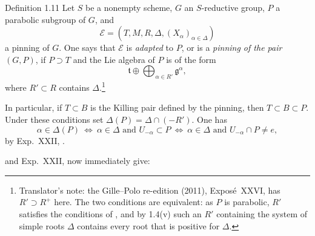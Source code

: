 \begin{sgastatement}{Definition 1.11}
Let \(S\) be a nonempty scheme, \(G\) an \(S\)-reductive group, \(P\) a
parabolic subgroup of \(G\), and
\[
 \mathcal E=(T,M,R,\Delta,(X_\alpha)_{\alpha\in\Delta})
\]
a pinning of \(G\).  One says that \(\mathcal E\) is \emph{adapted} to
\(P\), or is a \emph{pinning of the pair \((G,P)\)}, if \(P\supset T\) and
the Lie algebra of \(P\) is of the form
\[
 \mathfrak t\oplus\bigoplus_{\alpha\in R'}\mathfrak g^\alpha,
\]
where \(R'\subset R\) contains \(\Delta\).\footnote{Translator's note: the Gille--Polo re-edition (2011), Exposé~XXVI, has
\(R'\supset R^+\) here. The two conditions are equivalent: as \(P\) is
parabolic, \(R'\) satisfies the conditions of , and by 1.4(v) such an
\(R'\) containing the system of simple roots \(\Delta\) contains every root
that is positive for \(\Delta\).}
\end{sgastatement}

In particular, if \(T\subset B\) is the Killing pair defined by the
pinning, then \(T\subset B\subset P\).  Under these conditions set
\(\Delta(P)=\Delta\cap(-R')\).  One has
\[
 \alpha\in\Delta(P)
 \ \Longleftrightarrow\
 \alpha\in\Delta\text{ and }U_{-\alpha}\subset P
 \ \Longleftrightarrow\
 \alpha\in\Delta\text{ and }U_{-\alpha}\cap P\ne e,
\]
by Exp.\ XXII, .

 and Exp.\ XXII,  now immediately give:

